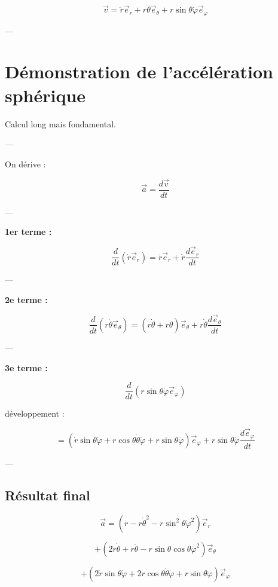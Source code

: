 \documentclass[11pt,a4paper]{article}
\begin{document}
\[
\vec{v} =
\dot{r}\vec{e}_r
+
r\dot{\theta}\vec{e}_\theta
+
r\sin\theta \dot{\varphi}\vec{e}_\varphi
\]

---

\section{Démonstration de l’accélération sphérique}

 Calcul long mais fondamental.

---

On dérive :

\[
\vec{a} = \frac{d\vec{v}}{dt}
\]

---

\textbf{1er terme :}

\[
\frac{d}{dt}(\dot{r}\vec{e}_r)
=
\ddot{r}\vec{e}_r + \dot{r}\frac{d\vec{e}_r}{dt}
\]

---

\textbf{2e terme :}

\[
\frac{d}{dt}(r\dot{\theta}\vec{e}_\theta)
=
(\dot{r}\dot{\theta} + r\ddot{\theta})\vec{e}_\theta
+ r\dot{\theta}\frac{d\vec{e}_\theta}{dt}
\]

---

\textbf{3e terme :}

\[
\frac{d}{dt}(r\sin\theta \dot{\varphi}\vec{e}_\varphi)
\]

développement :

\[
=
(\dot{r}\sin\theta \dot{\varphi}
+ r\cos\theta \dot{\theta}\dot{\varphi}
+ r\sin\theta \ddot{\varphi})\vec{e}_\varphi
+ r\sin\theta \dot{\varphi}\frac{d\vec{e}_\varphi}{dt}
\]

---

\subsection{Résultat final}

\[
\boxed{
\vec{a} =
(\ddot{r} - r\dot{\theta}^2 - r\sin^2\theta \dot{\varphi}^2)\vec{e}_r
}
\]

\[
+
\boxed{
(2\dot{r}\dot{\theta} + r\ddot{\theta}
- r\sin\theta\cos\theta \dot{\varphi}^2)\vec{e}_\theta
}
\]

\[
+
\boxed{
(2\dot{r}\sin\theta \dot{\varphi}
+ 2r\cos\theta\dot{\theta}\dot{\varphi}
+ r\sin\theta\ddot{\varphi})\vec{e}_\varphi
}
\]
\end{document}
